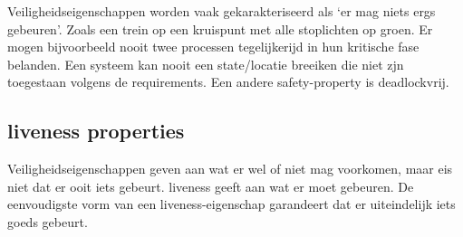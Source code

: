 \documentclass{article}
\begin{document}
	Veiligheidseigenschappen worden vaak gekarakteriseerd als ‘er mag niets ergs gebeuren’. Zoals een trein op een kruispunt met  alle stoplichten op groen. Er mogen bijvoorbeeld nooit twee processen tegelijkerijd in hun kritische fase belanden. Een systeem kan nooit een state/locatie breeiken die niet zjn toegestaan volgens de requirements. Een andere safety-property is deadlockvrij.
	
 

	\subsection{liveness properties}
	Veiligheidseigenschappen geven aan wat er wel of niet mag voorkomen,
	maar eis niet dat er ooit iets gebeurt. liveness geeft aan wat er moet gebeuren. De eenvoudigste vorm van een liveness-eigenschap garandeert dat er uiteindelijk iets goeds gebeurt.
	
\end{document}
